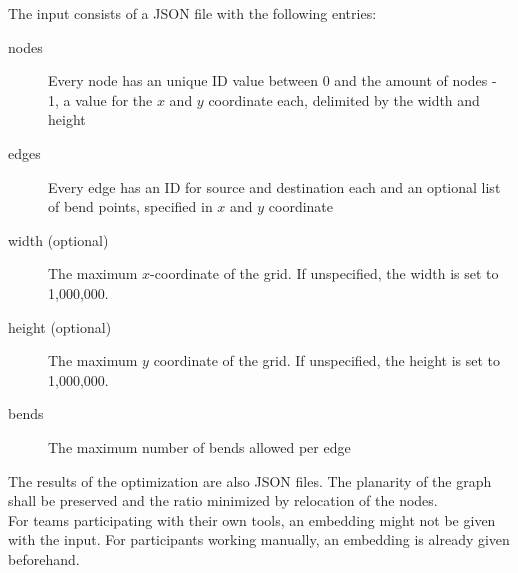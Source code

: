 \bigbreak The input consists of a JSON file with the following entries:
\begin{description}
	\item[nodes] Every node has an unique ID value between 0 and the amount of nodes - 1, a value for the $x$ and $y$ coordinate each, delimited by the width and height
	\item[edges] Every edge has an ID for source and destination each and an optional list of bend points, specified in $x$ and $y$ coordinate
	\item[width (optional)] The maximum $x$-coordinate of the grid. If unspecified, the width is set to 1,000,000.
	\item[height (optional)] The maximum $y$ coordinate of the grid. If unspecified, the height is set to 1,000,000.
	\item[bends] The maximum number of bends allowed per edge
\end{description}
The results of the optimization are also JSON files. The planarity of the graph shall be preserved and the ratio minimized by relocation of the nodes.\\
For teams participating with their own tools, an embedding might not be given with the input. For participants working manually, an embedding is already given beforehand.



